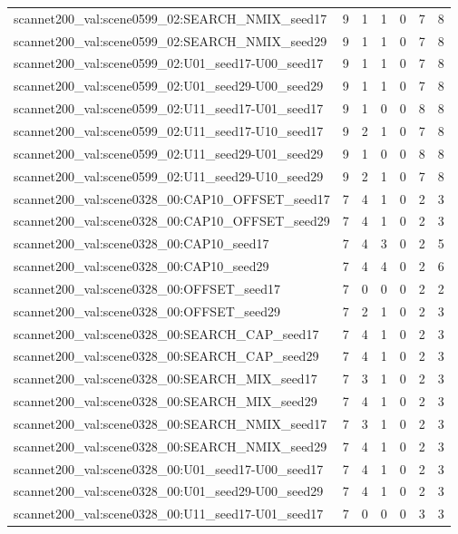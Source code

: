 \begin{table}[t]
\begin{tabular}{lrrrrrr}
scannet200\_val:scene0599\_02:SEARCH\_NMIX\_seed17 & 9 & 1 & 1 & 0 & 7 & 8 \\
scannet200\_val:scene0599\_02:SEARCH\_NMIX\_seed29 & 9 & 1 & 1 & 0 & 7 & 8 \\
scannet200\_val:scene0599\_02:U01\_seed17-U00\_seed17 & 9 & 1 & 1 & 0 & 7 & 8 \\
scannet200\_val:scene0599\_02:U01\_seed29-U00\_seed29 & 9 & 1 & 1 & 0 & 7 & 8 \\
scannet200\_val:scene0599\_02:U11\_seed17-U01\_seed17 & 9 & 1 & 0 & 0 & 8 & 8 \\
scannet200\_val:scene0599\_02:U11\_seed17-U10\_seed17 & 9 & 2 & 1 & 0 & 7 & 8 \\
scannet200\_val:scene0599\_02:U11\_seed29-U01\_seed29 & 9 & 1 & 0 & 0 & 8 & 8 \\
scannet200\_val:scene0599\_02:U11\_seed29-U10\_seed29 & 9 & 2 & 1 & 0 & 7 & 8 \\
scannet200\_val:scene0328\_00:CAP10\_OFFSET\_seed17 & 7 & 4 & 1 & 0 & 2 & 3 \\
scannet200\_val:scene0328\_00:CAP10\_OFFSET\_seed29 & 7 & 4 & 1 & 0 & 2 & 3 \\
scannet200\_val:scene0328\_00:CAP10\_seed17 & 7 & 4 & 3 & 0 & 2 & 5 \\
scannet200\_val:scene0328\_00:CAP10\_seed29 & 7 & 4 & 4 & 0 & 2 & 6 \\
scannet200\_val:scene0328\_00:OFFSET\_seed17 & 7 & 0 & 0 & 0 & 2 & 2 \\
scannet200\_val:scene0328\_00:OFFSET\_seed29 & 7 & 2 & 1 & 0 & 2 & 3 \\
scannet200\_val:scene0328\_00:SEARCH\_CAP\_seed17 & 7 & 4 & 1 & 0 & 2 & 3 \\
scannet200\_val:scene0328\_00:SEARCH\_CAP\_seed29 & 7 & 4 & 1 & 0 & 2 & 3 \\
scannet200\_val:scene0328\_00:SEARCH\_MIX\_seed17 & 7 & 3 & 1 & 0 & 2 & 3 \\
scannet200\_val:scene0328\_00:SEARCH\_MIX\_seed29 & 7 & 4 & 1 & 0 & 2 & 3 \\
scannet200\_val:scene0328\_00:SEARCH\_NMIX\_seed17 & 7 & 3 & 1 & 0 & 2 & 3 \\
scannet200\_val:scene0328\_00:SEARCH\_NMIX\_seed29 & 7 & 4 & 1 & 0 & 2 & 3 \\
scannet200\_val:scene0328\_00:U01\_seed17-U00\_seed17 & 7 & 4 & 1 & 0 & 2 & 3 \\
scannet200\_val:scene0328\_00:U01\_seed29-U00\_seed29 & 7 & 4 & 1 & 0 & 2 & 3 \\
scannet200\_val:scene0328\_00:U11\_seed17-U01\_seed17 & 7 & 0 & 0 & 0 & 3 & 3 \\

\end{tabular}
\end{table}
